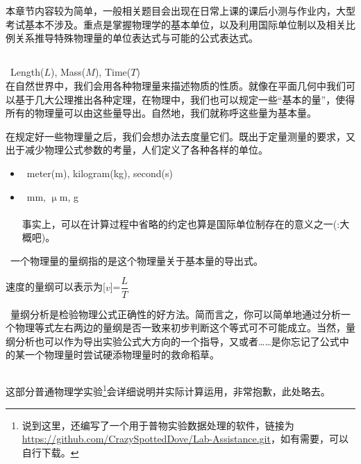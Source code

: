 \chapter[测量]{}
本章节内容较为简单，一般相关题目会出现在日常上课的课后小测与作业内，大型考试基本不涉及。重点是掌握物理学的基本单位，以及利用国际单位制以及相关比例关系推导特殊物理量的单位表达式与可能的公式表达式。
\section[单位与量纲]{}
\begin{Itemize}
    \item {}\ \eg Length($L$), Mass($M$), Time($T$)\\
    在自然世界中，我们会用各种物理量来描述物质的性质。就像在平面几何中我们可以基于几大公理推出各种定理，在物理中，我们也可以规定一些“基本的量”，使得所有的物理量可以由这些量导出。自然地，我们就称呼这些量为基本量。
    \item {}在规定好一些物理量之后，我们会想办法去度量它们。既出于定量测量的要求，又出于减少物理公式参数的考量，人们定义了各种各样的单位。
    \begin{itemize}
        \item {}\ \eg meter(m), kilogram(kg), second(s)
        \item {}\ \eg mm, $\upmu$m, g\\
              \\
              事实上，可以在计算过程中省略的约定也算是国际单位制存在的意义之一(\dove :大概吧)。
    \end{itemize}
    \item {}\ 一个物理量的量纲指的是这个物理量关于基本量的导出式。

    \eg 速度的量纲可以表示为[$v$]=$\dfrac{L}{T}$

    \item {}\ 量纲分析是检验物理公式正确性的好方法。简而言之，你可以简单地通过分析一个物理等式左右两边的量纲是否一致来初步判断这个等式可不可能成立。当然，量纲分析也可以作为导出实验公式大方向的一个指导，又或者……是你忘记了公式中的某一个物理量时尝试硬添物理量时的救命稻草。
\end{Itemize}
\section[数据处理]{}
这部分普通物理学实验\footnote{说到这里，\dove 还编写了一个用于普物实验数据处理的软件，链接为 \url{https://github.com/CrazySpottedDove/Lab-Assistance.git}，如有需要，可以自行下载。}会详细说明并实际计算运用，非常抱歉，此处略去。